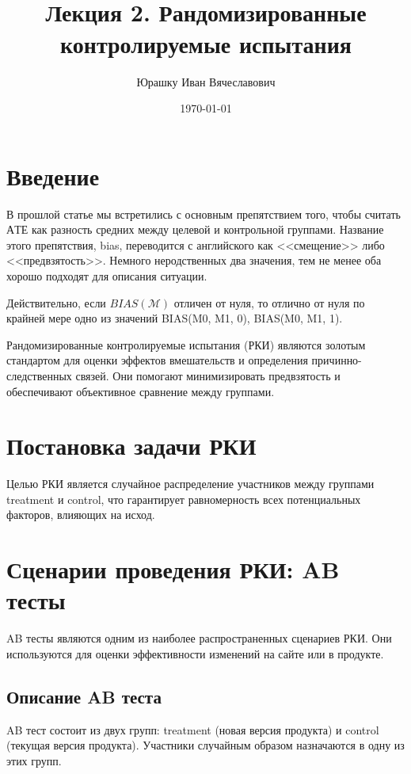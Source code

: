 \documentclass{article}
\title{
    \textbf{\coursename}\\
    Лекция 2. Рандомизированные контролируемые испытания
}
\author{Юрашку Иван Вячеславович}
\date{\today}
\begin{document}
\maketitle

\section{Введение}

    В прошлой статье мы встретились с основным препятствием того, чтобы считать $АТЕ$ как разность средних между целевой и контрольной группами.
    Название этого препятствия, bias, переводится с английского как <<смещение>> либо <<предвзятость>>.
    Немного неродственных два значения, тем не менее оба хорошо подходят для описания ситуации.

    Действительно, если $BIAS(\mathcal{M})$ отличен от нуля, то отлично от нуля по крайней мере одно из значений BIAS(M0, M1, 0), BIAS(M0, M1, 1).

    Рандомизированные контролируемые испытания (РКИ) являются золотым стандартом для оценки эффектов вмешательств и определения причинно-следственных связей.
    Они помогают минимизировать предвзятость и обеспечивают объективное сравнение между группами.

\section{Постановка задачи РКИ}

    Целью РКИ является случайное распределение участников между группами treatment и control, что гарантирует равномерность всех потенциальных факторов, влияющих на исход.

\section{Сценарии проведения РКИ: AB тесты}

    AB тесты являются одним из наиболее распространенных сценариев РКИ. Они используются для оценки эффективности изменений на сайте или в продукте.

\subsection{Описание AB теста}

    AB тест состоит из двух групп: treatment (новая версия продукта) и control (текущая версия продукта). Участники случайным образом назначаются в одну из этих групп.
\end{document}
